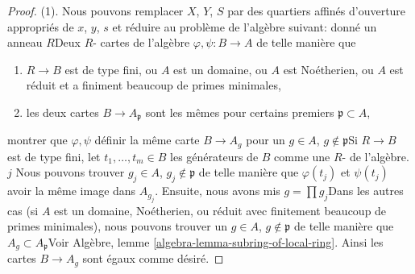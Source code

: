 \begin{proof}

(1). Nous pouvons remplacer $X$, $Y$, $S$ par des quartiers affinés d'ouverture appropriés de $x$, $y$, $s$ et réduire au problème de l'algèbre suivant: donné un anneau $R$Deux $R$- cartes de l'algèbre $\varphi, \psi : B \to A$
de telle manière que

\begin{enumerate}

\item  $R \to B$ est de type fini, ou $A$ est un domaine, ou $A$
est Noétherien, ou $A$ est réduit et a finiment beaucoup de primes minimales,
\item les deux cartes $B \to A_\mathfrak p$ sont les mêmes pour certains premiers $\mathfrak p \subset A$,

\end{enumerate}

montrer que $\varphi, \psi$ définir la même carte $B \to A_g$ pour un $g \in A$, $g \not \in \mathfrak p$Si $R \to B$ est de type fini, let $t_1, \ldots, t_m \in B$ les générateurs de $B$
comme une $R$- de l'algèbre. $j$ Nous pouvons trouver
$g_j \in A$, $g_j \not \in \mathfrak p$
de telle manière que $\varphi(t_j)$ et $\psi(t_j)$ avoir la même image dans
$A_{g_j}$. Ensuite, nous avons mis $g = \prod g_j$Dans les autres cas (si $A$ est un domaine, Noétherien, ou réduit avec finitement beaucoup de primes minimales), nous pouvons trouver un $g \in A$,
$g \not \in \mathfrak p$ de telle manière que $A_g \subset A_\mathfrak p$Voir Algèbre, lemme \ref{algebra-lemma-subring-of-local-ring}. Ainsi les cartes $B \to A_g$ sont égaux comme désiré.

\medskip\noindent


\end{proof}
